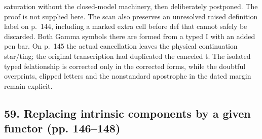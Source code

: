 saturation without the closed-model machinery, then deliberately postponed. The proof is not supplied here. The scan also preserves an unresolved raised definition label on p.~144, including a marked extra cell before def that cannot safely be discarded. Both Gamma symbols there are formed from a typed I with an added pen bar. On p.~145 the actual cancellation leaves the physical continuation star/ting; the original transcription had duplicated the canceled t. The isolated typed felationship is corrected only in the corrected forms, while the doubtful overprints, clipped letters and the nonstandard apostrophe in the dated margin remain explicit.

\subsection*{59. Replacing intrinsic components by a given functor (pp. 146--148)}
